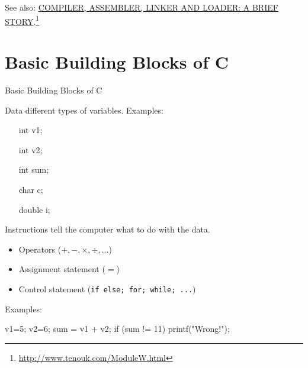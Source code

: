See also: \href{http://www.tenouk.com/ModuleW.html}{COMPILER, ASSEMBLER, LINKER AND LOADER:
A BRIEF STORY}.\footnote{\url{http://www.tenouk.com/ModuleW.html}}

\section{Basic Building Blocks of C}

\begin{frame}[fragile]{Basic Building Blocks of C}
  \begin{block}{Data}
    different \alert{types} of \alert{variables}. Examples:
    \begin{multicols}{3}
      \begin{itemize}
      \item[int] v1;
      \item[int] v2;
      \item[int] sum;
      \item[char] c;
      \item[double] i;
      \end{itemize}
    \end{multicols}
  \end{block}
  \begin{block}{Instructions}
    tell the computer what to do with the data.
    \begin{multicols}{2}
      \begin{itemize}
      \item Operators ($+, -, \times{}, \div{}, ...$)
      \item Assignment statement ($=$)
      \item Control statement (\texttt{if else; for; while; ...})
      \end{itemize}
    \end{multicols}
  \end{block}
  Examples:
  \begin{center}
\begin{ccode}
v1=5; v2=6;
sum = v1 + v2;
if (sum != 11) printf("Wrong!\n");
\end{ccode}    
  \end{center}
\end{frame}

